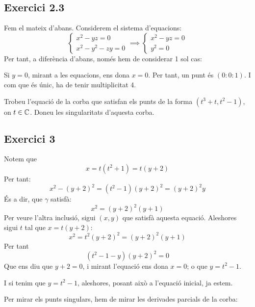 \documentclass[11pt, a4paper]{article}
\begin{document}
\subsection{Exercici 2.3}
Fem el mateix d'abans. Considerem el sistema d'equacions:
\[
    \begin{cases*}
        x^2-yz=0\\
        x^2-y^2-zy=0
    \end{cases*}\implies
    \begin{cases*}
        x^2-yz=0\\
        y^2=0
    \end{cases*}
\]
Per tant, a diferència d'abans, només hem de considerar 1 sol cas:\par
Si $y=0$, mirant a les equacions, ens dona $x=0$. Per tant, un punt és $(0:0:1)$. I com que és únic, ha de tenir multiplicitat 4.
\newpage
\begin{tcolorbox}[title=\section{Exercici 3}]
Trobeu l'equació de la corba que satisfan els punts de la forma $(t^3 + t, t^2 - 1)$, on $t \in \mathbb C$. Doneu les singularitats d'aquesta corba.
\end{tcolorbox}
\subsection{Exercici 3}
Notem que 
\[
    x=t(t^2+1)=t(y+2)
\]
Per tant:
\[
    x^2-(y+2)^2=(t^2-1)(y+2)^2=(y+2)^2y
\]
És a dir, que $\gamma$ satisfà:
\[
    x^2=(y+2)^2(y+1)
\]
Per veure l'altra inclusió, sigui $(x,y)$ que satisfà aquesta equació. Aleshores sigui $t$ tal que $x=t(y+2)$:
\[
    x^2=t^2(y+2)^2=(y+2)^2(y+1)
\]
Per tant
\[
    (t^2-1-y)(y+2)^2=0
\]
Que ens diu que $y+2=0$, i mirant l'equació ens dona $x=0$; o que $y=t^2-1$.\par
I si tenim que $y=t^2-1$, aleshores, posant això a l'equació inicial, ja estem.\par
Per mirar els punts singulars, hem de mirar les derivades parcials de la corba:
\end{document}
